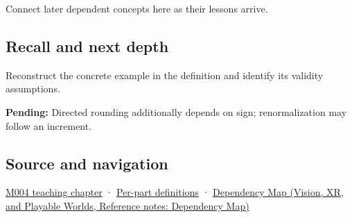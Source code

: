 Connect later dependent concepts here as their lessons arrive.

\subsection{Recall and next depth}\label{appendix-b572b631069b-recall-and-next-depth}

Reconstruct the concrete example in the definition and identify its validity assumptions.

\textbf{Pending:} Directed rounding additionally depends on sign; renormalization may follow an increment.

\subsection{Source and navigation}\label{appendix-b572b631069b-source-and-navigation}

\hyperref[01-foundations-i-ch001-a-stretching-ruler-for-real-valued-quantities]{M004 teaching chapter} · \hyperref[appendix-fd090d982a15-m004---parts-61-76]{Per-part definitions} · \href{../07-Vision-XR-and-Playable-Worlds/main.pdf\#nameddest=appendix-4ad47bdd269a}{Dependency Map (Vision, XR, and Playable Worlds, Reference notes: Dependency Map)}
